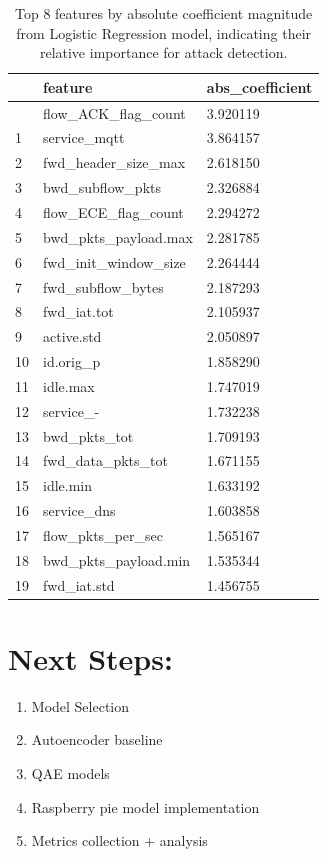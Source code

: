 \documentclass[
  letterpaper,
  DIV=11,
  numbers=noendperiod]{scrartcl}
\providecommand{\tightlist}{%
  \setlength{\itemsep}{0pt}\setlength{\parskip}{0pt}}
\begin{document}
\begin{longtable}[]{@{}lll@{}}

\caption{\label{tbl-rtiot-lr-coefs}Top 8 features by absolute
coefficient magnitude from Logistic Regression model, indicating their
relative importance for attack detection.}

\tabularnewline

\toprule\noalign{}
& feature & abs\_coefficient \\
\midrule\noalign{}
\endhead
\bottomrule\noalign{}
\endlastfoot
0 & flow\_ACK\_flag\_count & 3.920119 \\
1 & service\_mqtt & 3.864157 \\
2 & fwd\_header\_size\_max & 2.618150 \\
3 & bwd\_subflow\_pkts & 2.326884 \\
4 & flow\_ECE\_flag\_count & 2.294272 \\
5 & bwd\_pkts\_payload.max & 2.281785 \\
6 & fwd\_init\_window\_size & 2.264444 \\
7 & fwd\_subflow\_bytes & 2.187293 \\
8 & fwd\_iat.tot & 2.105937 \\
9 & active.std & 2.050897 \\
10 & id.orig\_p & 1.858290 \\
11 & idle.max & 1.747019 \\
12 & service\_- & 1.732238 \\
13 & bwd\_pkts\_tot & 1.709193 \\
14 & fwd\_data\_pkts\_tot & 1.671155 \\
15 & idle.min & 1.633192 \\
16 & service\_dns & 1.603858 \\
17 & flow\_pkts\_per\_sec & 1.565167 \\
18 & bwd\_pkts\_payload.min & 1.535344 \\
19 & fwd\_iat.std & 1.456755 \\

\end{longtable}

\section{Next Steps:}\label{next-steps}

\begin{enumerate}
\def\labelenumi{\arabic{enumi})}
\tightlist
\item
  Model Selection
\item
  Autoencoder baseline
\item
  QAE models
\item
  Raspberry pie model implementation
\item
  Metrics collection + analysis
\end{enumerate}
\end{document}
